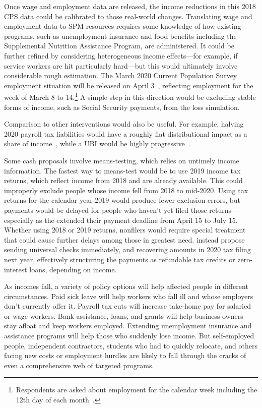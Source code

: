 \documentclass[12pt]{article}
\begin{document}
Once wage and employment data are released, the income reductions in this 2018 CPS data could be calibrated to those real-world changes. Translating wage and employment data to SPM resources requires some knowledge of how existing programs, such as unemployment insurance and food benefits including the Supplemental Nutrition Assistance Program, are administered. It could be further refined by considering heterogeneous income effects---for example, if service workers are hit particularly hard---but this would ultimately involve considerable rough estimation. The March 2020 Current Population Survey employment situation will be released on April 3~\cite{bls_releases}, reflecting employment for the week of March 8 to 14.\footnote{Respondents are asked about employment for the calendar week including the 12th day of each month~\cite{bls_cps_faq}.} A simple step in this direction would be excluding stable forms of income, such as Social Security payments, from the loss simulation.

Comparison to other interventions would also be useful. For example, halving 2020 payroll tax liabilities would have a roughly flat distributional impact as a share of income~\cite{taxbrain}, while a UBI would be highly progressive~\cite{ghenis_yang}.

Some cash proposals involve means-testing, which relies on untimely income information. The fastest way to means-test would be to use 2019 income tax returns, which reflect income from 2018 and are already available. This could improperly exclude people whose income fell from 2018 to mid-2020. Using tax returns for the calendar year 2019 would produce fewer exclusion errors, but payments would be delayed for people who haven't yet filed those returns---especially as the  extended their payment deadline from April 15 to July 15. Whether using 2018 or 2019 returns, nonfilers would require special treatment that could cause further delays among those in greatest need.  instead propose sending universal checks immediately, and recovering amounts in 2020 tax filing next year, effectively structuring the payments as refundable tax credits or zero-interest loans, depending on income.

As incomes fall, a variety of policy options will help affected people in different circumstances. Paid sick leave will help workers who fall ill and whose employers don't currently offer it. Payroll tax cuts will increase take-home pay for salaried or wage workers. Bank assistance, loans, and grants will help business owners stay afloat and keep workers employed. Extending unemployment insurance and assistance programs will help those who suddenly lose income. But self-employed people, independent contractors, students who had to quickly relocate, and others facing new costs or employment hurdles are likely to fall through the cracks of even a comprehensive web of targeted programs.
\end{document}
